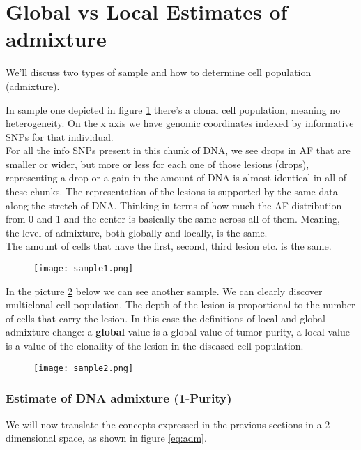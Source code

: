 \section{Global vs Local Estimates of admixture}
We'll discuss two types of sample and how to determine cell population (admixture).

In sample one depicted in figure \ref{fig:sample1} there's a clonal cell population, meaning no heterogeneity. On the x axis we have genomic coordinates indexed by informative SNPs for that individual.
\\
For all the info SNPs present in this chunk of DNA, we see drops in AF that are smaller or wider, but more or less for each one of those lesions (drops), representing a drop or a gain in the amount of DNA is almost identical in all of these chunks.
The representation of the lesions is supported by the same data along the stretch of DNA.
Thinking in terms of how much the AF distribution from 0 and 1 and the center is basically the same across all of them. Meaning, the level of admixture, both globally and locally, is the same. \\
The amount of cells that have the first, second, third lesion etc. is the same.

\begin{figure}[H]
	\centering
	\texttt{[image: sample1.png]}
	\caption{\label{fig:sample1}}
\end{figure}

In the picture \ref{fig:sample2} below we can see another sample.
We can clearly discover multiclonal cell population. The depth of the lesion is proportional to the number of cells that carry the lesion.
In this case the definitions of local and global admixture change: a \textbf{global} value is a global value of tumor purity, a local value is a value of the clonality of the lesion in the diseased cell population.

\begin{figure}[H]
	\centering
	\texttt{[image: sample2.png]}
	\caption{\label{fig:sample2} }
\end{figure}

\subsubsection{Estimate of DNA admixture (1-Purity)}
We will now translate the concepts expressed in the previous sections in a 2-dimensional space, as shown in figure \ref{eq:adm}.

